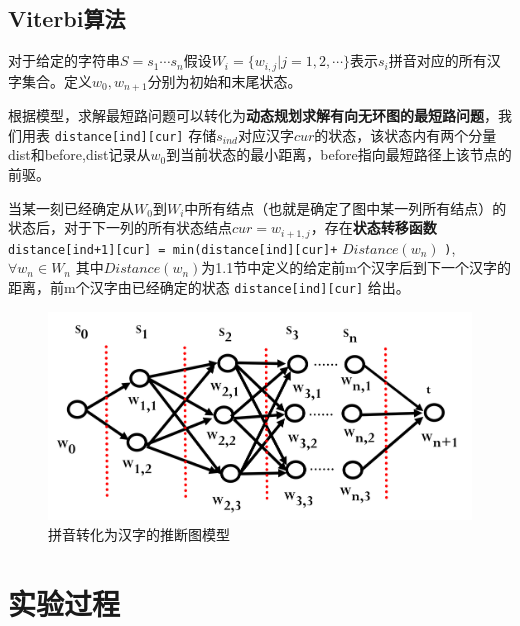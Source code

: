 \documentclass{article}
\begin{document}
\begin{spacing}{1.1}
	\subsection{Viterbi算法}
	\hspace{1.4em}
	对于给定的字符串$S=s_1\cdots s_n$假设$W_i = \{w_{i,j}|j=1,2,\cdots\}$表示$s_i$拼音对应的所有汉字集合。定义$w_0,w_{n+1}$分别为初始和末尾状态。
	
	根据模型，求解最短路问题可以转化为\textbf{动态规划求解有向无环图的最短路问题}，我们用表 \verb|distance[ind][cur]| 存储$s_{ind}$对应汉字$cur$的状态，该状态内有两个分量dist和before,dist记录从$w_0$到当前状态的最小距离，before指向最短路径上该节点的前驱。
	
	当某一刻已经确定从$W_0$到$W_i$中所有结点（也就是确定了图中某一列所有结点）的状态后，对于下一列的所有状态结点$cur = w_{i+1,j}$，存在\textbf{状态转移函数} \verb|distance[ind+1][cur] = min(distance[ind][cur]+| $Distance(w_n)$ \verb|)|,$\forall w_n \in W_n$ 其中$Distance(w_n)$为1.1节中定义的给定前m个汉字后到下一个汉字的距离，前m个汉字由已经确定的状态 \verb|distance[ind][cur]| 给出。
	
	\begin{figure}[h]
		\centering
		\includegraphics[width=0.8\linewidth]{pic/01.png}
		\caption{拼音转化为汉字的推断图模型}
	\end{figure}

\section{实验过程}

\end{spacing}
\end{document}
